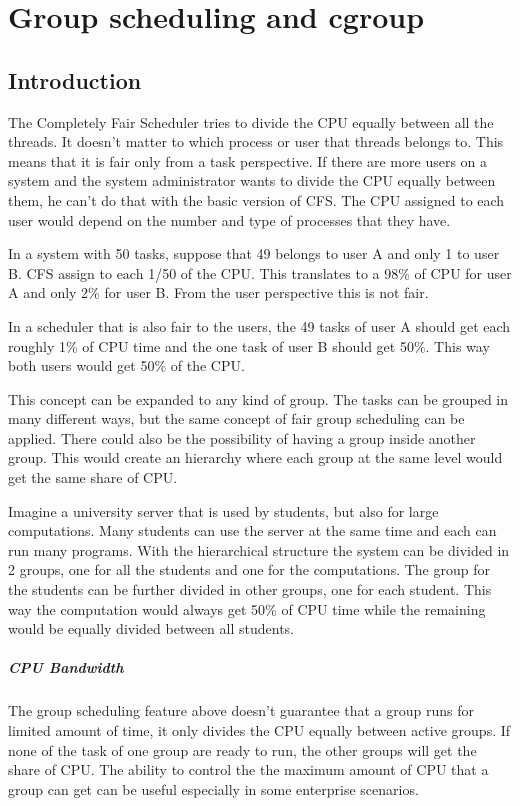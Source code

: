\chapter{Group scheduling and cgroup} %

\section{Introduction}

The Completely Fair Scheduler tries to divide the CPU equally between all the threads. It doesn't matter to which process or user that threads belongs to. This means that it is fair only from a task perspective. If there are more users on a system and the system administrator wants to divide the CPU equally between them, he can't do that with the basic version of CFS. The CPU assigned to each user would depend on the number and type of processes that they have.

In a system with 50 tasks, suppose that 49 belongs to user A and only 1 to user B. CFS assign to each 1/50 of the CPU. This translates to a 98\% of CPU for user A and only 2\% for user B. From the user perspective this is not fair.

In a scheduler that is also fair to the users, the 49 tasks of user A should get each roughly 1\% of CPU time and the one task of user B should get 50\%. This way both users would get 50\% of the CPU. 

This concept can be expanded to any kind of group. The tasks can be grouped in many different ways, but the same concept of fair group scheduling can be applied. There could also be the possibility of having a group inside another group. This would create an hierarchy where each group at the same level would get the same share of CPU.

Imagine a university server that is used by students, but also for large computations. Many students can use the server at the same time and each can run many programs. With the hierarchical structure the system can be divided in 2 groups, one for all the students and one for the computations. The group for the students can be further divided in other groups, one for each student. This way the computation would always get 50\% of CPU time while the remaining would be equally divided between all students.

\paragraph{CPU Bandwidth}
The group scheduling feature above doesn't guarantee that a group runs for limited amount of time, it only divides the CPU equally between active groups. If none of the task of one group are ready to run, the other groups will get the share of CPU. The ability to control the the maximum amount of CPU that a group can get can be useful especially in some enterprise scenarios. 

